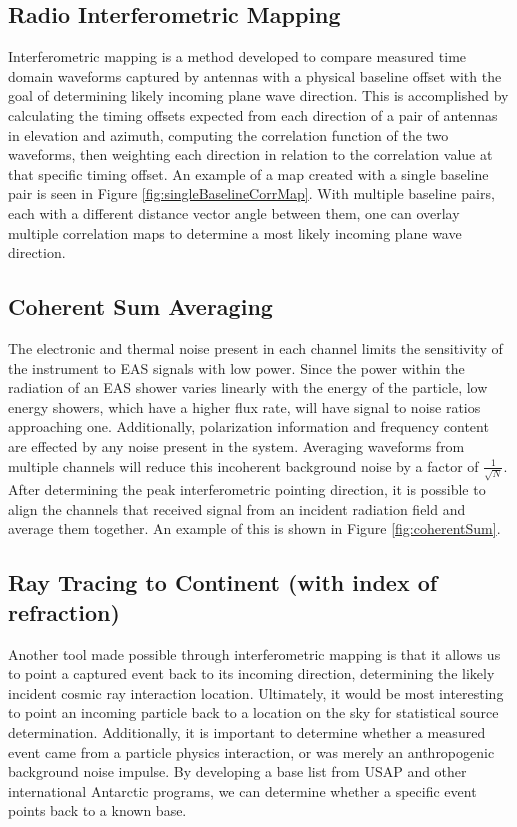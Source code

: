 	\subsection{Radio Interferometric Mapping}
		Interferometric mapping is a method developed to compare measured time domain waveforms captured by antennas with a physical baseline offset with the goal of determining likely incoming plane wave direction.  This is accomplished by calculating the timing offsets expected from each direction of a pair of antennas in elevation and azimuth, computing the correlation function of the two waveforms, then weighting each direction in relation to the correlation value at that specific timing offset.  An example of a map created with a single baseline pair is seen in Figure \ref{fig:singleBaselineCorrMap}.  With multiple baseline pairs, each with a different distance vector angle between them, one can overlay multiple correlation maps to determine a most likely incoming plane wave direction.
		
	\subsection{Coherent Sum Averaging}
		The electronic and thermal noise present in each channel limits the sensitivity of the instrument to EAS signals with low power.  Since the power within the radiation of an EAS shower varies linearly with the energy of the particle, low energy showers, which have a higher flux rate, will have signal to noise ratios approaching one.  Additionally, polarization information and frequency content are effected by any noise present in the system.  Averaging waveforms from multiple channels will reduce this incoherent background noise by a factor of $\frac{1}{\sqrt{N}}$.  After determining the peak interferometric pointing direction, it is possible to align the channels that received signal from an incident radiation field and average them together.  An example of this is shown in Figure \ref{fig:coherentSum}.
	
	
	\subsection{Ray Tracing to Continent (with index of refraction)}
		Another tool made possible through interferometric mapping is that it allows us to point a captured event back to its incoming direction, determining the likely incident cosmic ray interaction location.  Ultimately, it would be most interesting to point an incoming particle back to a location on the sky for statistical source determination.  Additionally, it is important to determine whether a measured event came from a particle physics interaction, or was merely an anthropogenic background noise impulse.  By developing a base list from USAP and other international Antarctic programs, we can determine whether a specific event points back to a known base.
		
